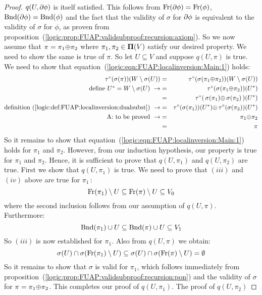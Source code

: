 \begin{proof}
$q(U,\mbox{$\partial$}\phi)$ is itself satisfied. This follows from
$\mbox{\rm Fr}(\mbox{$\partial$}\phi)=\mbox{\rm Fr}(\phi)$, $\mbox{\rm Bnd}(\mbox{$\partial$}\phi)=\mbox{\rm Bnd}(\phi)$ and
the fact that the validity of $\sigma$ for $\mbox{$\partial$}\phi$ is equivalent
to the validity of $\sigma$ for $\phi$, as proven from
proposition~(\ref{logic:prop:FUAP:validsubproof:recursion:axiom}).
So we now assume that $\pi=\pi_{1}\mbox{$\oplus$}\pi_{2}$ where
$\pi_{1},\pi_{2}\in\mbox{${\bf\Pi}(V)$}$ satisfy our desired property. We need to
show the same is true of $\pi$. So let $U\subseteq V$ and suppose
$q(U,\pi)$ is true. We need to show that
equation~(\ref{logic:eqn:FUAP:localinversion:Main:1}) holds:
    \begin{eqnarray*}
    \tau^{\circ}(\sigma(\pi))(W\setminus\sigma(U))&=&
    \tau^{\circ}(\sigma(\pi_{1}\mbox{$\oplus$}\pi_{2}))(W\setminus\sigma(U))\\
    \mbox{define $U^{*}=W\setminus\sigma(U)$}\ \rightarrow
    &=&\tau^{\circ}(\sigma(\pi_{1}\mbox{$\oplus$}\pi_{2}))(U^{*})\\
    &=&\tau^{\circ}(\,\sigma(\pi_{1})\mbox{$\oplus$}\,\sigma(\pi_{2})\,)(U^{*})\\
    \mbox{definition~(\ref{logic:def:FUAP:localinversion:dualsubst})}\
    \rightarrow
    &=&\tau^{\circ}(\sigma(\pi_{1}))(U^{*})\mbox{$\oplus$}\,\tau^{\circ}(\sigma(\pi_{2}))(U^{*})\\
    \mbox{A: to be proved}\ \rightarrow&=&\pi_{1}\mbox{$\oplus$}\pi_{2}\\
    &=&\pi
    \end{eqnarray*}
So it remains to show that
equation~(\ref{logic:eqn:FUAP:localinversion:Main:1}) holds for
$\pi_{1}$ and $\pi_{2}$. However, from our induction hypothesis, our
property is true for $\pi_{1}$ and $\pi_{2}$. Hence, it is
sufficient to prove that $q(U,\pi_{1})$ and $q(U,\pi_{2})$ are true.
First we show that $q(U,\pi_{1})$ is true. We need to prove that
$(iii)$ and $(iv)$ above are true for $\pi_{1}$\,:
    \[
    \mbox{\rm Fr}(\pi_{1})\setminus U\subseteq\mbox{\rm Fr}(\pi)\setminus U\subseteq V_{0}
    \]
where the second inclusion follows from our assumption of
$q(U,\pi)$. Furthermore:
    \[
    \mbox{\rm Bnd}(\pi_{1})\cup U\subseteq\mbox{\rm Bnd}(\pi)\cup U\subseteq V_{1}
    \]
So $(iii)$ is now established for $\pi_{1}$. Also from $q(U,\pi)$ we
obtain:
    \[
    \sigma(U)\cap\sigma(\mbox{\rm Fr}(\pi_{1})\setminus U)\subseteq
    \sigma(U)\cap\sigma(\mbox{\rm Fr}(\pi)\setminus U)=\emptyset
    \]
So it remains to show that $\sigma$ is valid for $\pi_{1}$, which
follows immediately from
proposition~(\ref{logic:prop:FUAP:validsubproof:recursion:pon}) and
the validity of $\sigma$ for $\pi=\pi_{1}\mbox{$\oplus$}\pi_{2}$. This
completes our proof of $q(U,\pi_{1})$. The proof of $q(U,\pi_{2})$

\end{proof}
